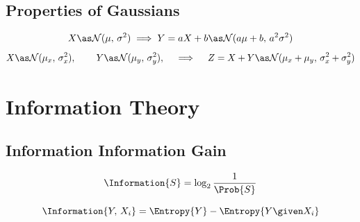 \documentclass[18pt,a3paper,landscape, ncols=3]{cheatsheet}
\begin{document}
	\subsection{Properties of Gaussians}
		\begin{mdframed}
			\[
				X \as \mathcal{N}(\mu,\, \sigma^2) \implies Y = aX + b \as \mathcal{N}(a\mu + b,\, a^2\sigma^2)
			\]
			\[
				X \as \mathcal{N}(\mu_x,\, \sigma^2_x),\,\qquad Y \as \mathcal{N}(\mu_y,\, \sigma^2_y),\,\quad \implies \quad Z = X + Y \as \mathcal{N}(\mu_x + \mu_y,\, \sigma^2_x + \sigma^2_y)
			\]
		\end{mdframed}
	

\section{Information Theory} \seperator
	\subsection{Information \qquad\qquad\qquad\qquad\qquad\qquad Information Gain}
		\begin{mdframed}
			\begin{minipage}{0.5\textwidth}
				\[
					\Information{S} = \log_2 \frac{1}{\Prob{S}}
				\]
			\end{minipage}%
			\vrule%
			\begin{minipage}{0.5\textwidth}
				\[
					\Information{Y,\, X_i} = \Entropy{Y} - \Entropy{Y \given X_i}
				\]
			\end{minipage}
		\end{mdframed}
\end{document}
